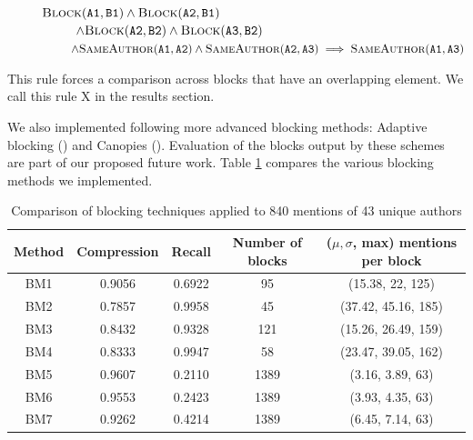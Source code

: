 \documentclass{article}
\begin{document}
             $ ~~~~~~~~\textsc{Block}(\texttt{A1}, \texttt{B1}) \wedge \textsc{Block}(\texttt{A2}, \texttt{B1}) $  \\
                    $ ~~~~~~~~~~~~~~~~\wedge \textsc{Block}(\texttt{A2}, \texttt{B2}) \wedge \textsc{Block}(\texttt{A3}, \texttt{B2}) $ \\
                    $ ~~~~~~~~~~~~~~~~ \wedge  \textsc{SameAuthor}(\texttt{A1}, \texttt{A2}) \wedge \textsc{SameAuthor}(\texttt{A2}, \texttt{A3}) 
                    \implies \textsc{SameAuthor}(\texttt{A1},\texttt{A3}) $
            
            This rule forces a comparison across blocks that have an overlapping element. We call this rule X in the results section.
            
            We also implemented following more advanced blocking methods: Adaptive blocking (\cite{bilenko2006adaptive}) and Canopies (\cite{mccallum2000efficient}). Evaluation of the blocks output by these schemes are part of our proposed future work. Table \ref{tab:blocking-stats-compare} compares the various blocking methods we implemented. 
            
            \begin{table}
               \begin{center}
                  \begin{tabular}{| c | c | c | c | c |}
                     \hline
                        Method & Compression & Recall & Number of blocks & ($\mu, \sigma$, max) mentions per block \\
                     \hline
                         BM1 & 0.9056 & 0.6922 & 95   & (15.38, 22, 125)    \\
                         BM2 & 0.7857 & 0.9958 & 45   & (37.42, 45.16, 185) \\
                         BM3 & 0.8432 & 0.9328 & 121  & (15.26, 26.49, 159) \\
                         BM4 & 0.8333 & 0.9947 & 58   & (23.47, 39.05, 162) \\
                         BM5 & 0.9607 & 0.2110 & 1389 & (3.16, 3.89, 63)    \\
                         BM6 & 0.9553 & 0.2423 & 1389 & (3.93, 4.35, 63)    \\
                         BM7 & 0.9262 & 0.4214 & 1389 & (6.45, 7.14, 63)    \\
                     \hline
                  \end{tabular}
                  \caption{Comparison of blocking techniques applied to 840 mentions of 43 unique authors}
                  \label{tab:blocking-stats-compare}
               \end{center}
            \end{table}
            
\end{document}
